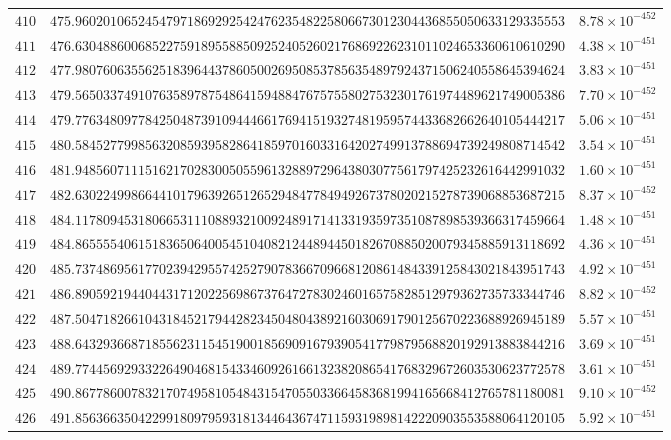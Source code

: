 \documentclass[12pt,reqno]{amsart}
\theoremstyle{remark}
\begin{document}
\begin{longtable}{clc}
$410$ & $475.9602010652454797186929254247623548225806673012304436855050633129335553$ & $8.78\times 10^{-452}$ \\
$411$ & $476.6304886006852275918955885092524052602176869226231011024653360610610290$ & $4.38\times 10^{-451}$ \\
$412$ & $477.9807606355625183964437860500269508537856354897924371506240558645394624$ & $3.83\times 10^{-451}$ \\
$413$ & $479.5650337491076358978754864159488476757558027532301761974489621749005386$ & $7.70\times 10^{-452}$ \\
$414$ & $479.7763480977842504873910944466176941519327481959574433682662640105444217$ & $5.06\times 10^{-451}$ \\
$415$ & $480.5845277998563208593958286418597016033164202749913788694739249808714542$ & $3.54\times 10^{-451}$ \\
$416$ & $481.9485607111516217028300505596132889729643803077561797425232616442991032$ & $1.60\times 10^{-451}$ \\
$417$ & $482.6302249986644101796392651265294847784949267378020215278739068853687215$ & $8.37\times 10^{-452}$ \\
$418$ & $484.1178094531806653111088932100924891714133193597351087898539366317459664$ & $1.48\times 10^{-451}$ \\
$419$ & $484.8655554061518365064005451040821244894450182670885020079345885913118692$ & $4.36\times 10^{-451}$ \\
$420$ & $485.7374869561770239429557425279078366709668120861484339125843021843951743$ & $4.92\times 10^{-451}$ \\
$421$ & $486.8905921944044317120225698673764727830246016575828512979362735733344746$ & $8.82\times 10^{-452}$ \\
$422$ & $487.5047182661043184521794428234504804389216030691790125670223688926945189$ & $5.57\times 10^{-451}$ \\
$423$ & $488.6432936687185562311545190018569091679390541779879568820192913883844216$ & $3.69\times 10^{-451}$ \\
$424$ & $489.7744569293322649046815433460926166132382086541768329672603530623772578$ & $3.61\times 10^{-451}$ \\
$425$ & $490.8677860078321707495810548431547055033664583681994165668412765781180081$ & $9.10\times 10^{-452}$ \\
$426$ & $491.8563663504229918097959318134464367471159319898142220903553588064120105$ & $5.92\times 10^{-451}$ \\

\end{longtable}
\end{document}
